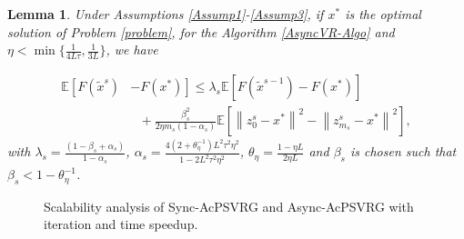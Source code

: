 \documentclass[letterpaper]{article} %
\newcommand*{\E}{\mathbb{E}}
\newcommand{\norm}[1]{\left\lVert#1\right\rVert}
\newtheorem{lemma}{Lemma}
\begin{document}
\begin{lemma}\label{lemma1}
Under Assumptions \ref{Assump1}-\ref{Assump3}, if $x^*$ is the optimal solution of Problem \eqref{problem}, for the Algorithm \ref{AsyncVR-Algo} and $\eta < \min\{\frac{1}{4L
\tau}, \frac{1}{3L}\}$, we have 

\begin{equation}
\begin{split}
\E\left[ F(\widetilde{x}^s)\right. &-\left. F(x^*)\right]
\leq \lambda_s\E[F(\widetilde{x}^{s-1}) - F(x^*)]\\
&~~~+{\frac{\beta_s^2}{2\eta m_s(1-\alpha_s)}}\E[\norm{z_{0}^s-x^*}^2-\norm{z_{m_s}^s-x^*}^2 ],
\end{split}
\end{equation}
with $\lambda_s = \frac{(1-\beta_s+\alpha_s)}{1-\alpha_s}$, $\alpha_s=\frac{4(2+\theta_{\eta}^{-1})L^2\tau^2\eta^2}{1-2L^2 \tau^2\eta^2}$, $\theta_{\eta} = \frac{1-\eta L}{2\eta L}$ and $\beta_s$ is chosen such that $\beta_s < 1-\theta_{\eta}^{-1}$.
\end{lemma}
\begin{figure}[htbp]
%
%
%
%
\setlength{\abovecaptionskip}{2pt}
\caption{Scalability analysis of Sync-AcPSVRG and Async-AcPSVRG with iteration and time speedup. }
\label{fig:FSVRG_speedup}
\end{figure}
\end{document}
